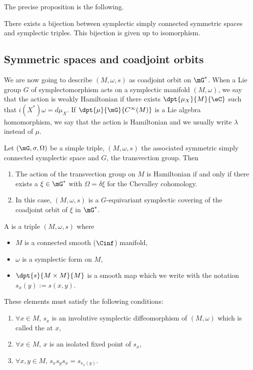 The precise proposition is the following.

\begin{proposition}
	There exists a bijection between symplectic simply connected symmetric spaces and symplectic triples. This bijection is given up to isomorphism.
\end{proposition}

\subsection{Symmetric spaces and coadjoint orbits}

We are now going to describe $(M,\omega,s)$ as coadjoint orbit on $\mG^*$. When a Lie group $G$ of symplectomorphism acts on a symplectic manifold $(M,\omega)$, we say that the action is weakly Hamiltonian if there exists $\dpt{\mu_X}{M}{\eC}$ such that $i(X^*)\omega=d\mu_X$. If $\dpt{\mu}{\mG}{ C^{\infty}(M)}$ is a Lie algebra homomorphism, we say that the action is Hamiltonian and we usually write $\lambda$ instead of $\mu$.

\begin{proposition}
	Let $(\mG,\sigma,\Omega)$ be a simple triple, $(M,\omega,s)$ the associated symmetric simply connected symplectic space and $G$, the transvection group. Then

	\begin{enumerate}
		\item The action of the transvection group on $M$ is Hamiltonian if and only if there exists a $\xi\in\mG^*$ with $\Omega=\delta\xi$ for the Chevalley cohomology.
		\item In this case, $(M,\omega,s)$ is a $G$-equivariant symplectic covering of the coadjoint orbit of $\xi$ in $\mG^*$.
	\end{enumerate}

\end{proposition}

\begin{definition}
	A  is a triple $(M,\omega,s)$ where
	\begin{itemize}
		\item $M$ is a connected smooth ($\Cinf$) manifold,
		\item $\omega$ is a symplectic form on $M$,
		\item $\dpt{s}{M\times M}{M}$ is a smooth map which we write with the notation $s_x(y):=s(x,y)$.
	\end{itemize}
	These elements must satisfy the following conditions:
	\begin{enumerate}
		\item $\forall x\in M$, $s_x$ is an involutive symplectic diffeomorphism of $(M,\omega)$ which is called the  at $x$,
		\item $\forall x\in M$, $x$ is an isolated fixed point of $s_x$,
		\item $\forall x,y\in M$, $s_xs_ys_x=s_{s_x(y)}$.
	\end{enumerate}

\end{definition}


